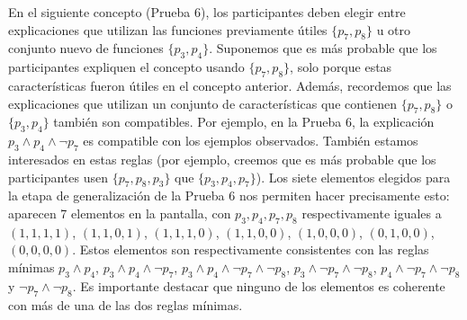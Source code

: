 \begin{hyp}
En el siguiente concepto (Prueba 6), los participantes deben elegir entre explicaciones que utilizan las
funciones previamente útiles $\{p_7, p_8 \}$ u otro conjunto nuevo de funciones $\{p_3, p_4 \}$.
Suponemos que es más probable que los participantes expliquen el concepto usando $\{p_7, p_8 \}$, solo porque estas características fueron útiles en el concepto anterior. Además, recordemos que las explicaciones que utilizan un conjunto de características que contienen $\{p_7, p_8 \}$ o $\{p_3, p_4 \}$ también son compatibles. Por ejemplo, en la Prueba 6, la explicación $p_3 \land p_4 \land \lnot p_7$ es compatible con los ejemplos observados. También estamos interesados en estas reglas (por ejemplo, creemos que es más probable que los participantes usen $\{p_7, p_8, p_3 \}$ que $\{p_3, p_4, p_7 \}$).  Los siete elementos elegidos para la etapa de generalización de la Prueba 6 nos permiten hacer precisamente esto: aparecen 7 elementos en la pantalla, con $p_3, p_4, p_7, p_8$ respectivamente iguales a $ (1, 1, 1, 1) $, $ (1, 1, 0, 1) $, $ (1, 1, 1, 0) $, $ (1, 1, 0, 0) $, $ (1, 0, 0, 0) $, $ ( 0, 1, 0, 0) $, $ (0, 0, 0, 0) $. Estos elementos son respectivamente consistentes con las reglas mínimas $p_3 \land p_4 $, $ p_3 \land p_4 \land \lnot p_7 $, $ p_3 \land p_4 \land \lnot p_7 \land \lnot p_8 $, $ p_3 \land \lnot p_7 \land \lnot p_8 $, $ p_4 \land \lnot p_7 \land \lnot p_8 $ y $ \lnot p_7 \land \lnot p_8 $. Es importante destacar que ninguno de los elementos es coherente con más de una de las dos reglas mínimas.


\end{hyp}
